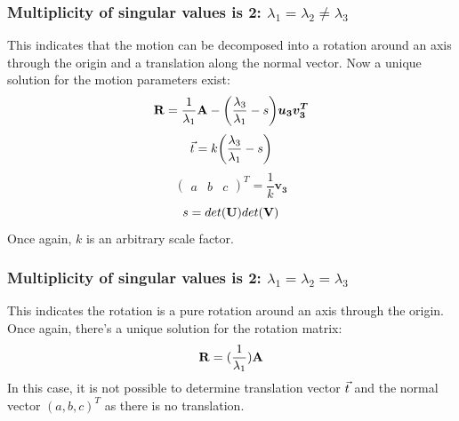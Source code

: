 \subsubsection{Multiplicity of singular values is 2: $\lambda_1 = \lambda_2 \neq \lambda_3$}
This indicates that the motion can be decomposed into a rotation around an axis through the origin and a translation along the normal vector. Now a unique solution for the motion parameters exist:
\begin{equation*}
    \mathbf{R} = \frac{1}{\lambda_1}\mathbf{A}-\biggl(\frac{\lambda_3}{\lambda_1}-s\biggr)\boldsymbol{u_3}\boldsymbol{v_3^T}
\end{equation*}
\begin{equation*}
    \vec t = k\biggl(\frac{\lambda_3}{\lambda_1}-s\biggr)
\end{equation*}
\begin{equation*}
    \begin{pmatrix}
        a & b & c
    \end{pmatrix}^T = \frac{1}{k}\boldsymbol{v_3}
\end{equation*}
\begin{equation*}
    s = det(\mathbf{U}) det(\mathbf{V})
\end{equation*}
Once again, $k$ is an arbitrary scale factor.
\subsubsection{Multiplicity of singular values is 2: $\lambda_1 = \lambda_2 = \lambda_3$}
This indicates the rotation is a pure rotation around an axis through the origin. Once again, there's a unique solution for the rotation matrix:
\begin{equation*}
    \mathbf{R} = (\frac{1}{\lambda_1})\mathbf{A}
\end{equation*}
In this case, it is not possible to determine translation vector $\vec t$ and the normal vector $(a, b, c)^T$ as there is no translation.
